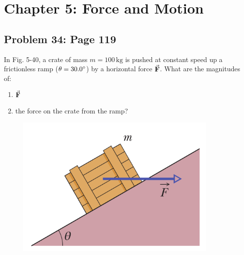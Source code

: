 \documentclass{article}
\begin{document}
\newpage

\section{Chapter 5: Force and Motion}
    \subsection{Problem 34: Page 119}
    In Fig. 5-40, a crate of mass $m=100\,\mathrm{kg}$ is 
    pushed at constant speed up a frictionless ramp ($\theta=30.0\degree$)
    by a horizontal force $\va{F}$. What are the magnitudes of:
    \begin{enumerate}[label=(\alph*)]
        \item $\va{F}$
        \item the force on the crate from the ramp?
    \end{enumerate}
    \begin{figure}[h!]
        \centering 
        \includegraphics[width=10cm]{Exam1Practice_Figures/force.png}
    \end{figure}
\end{document}
